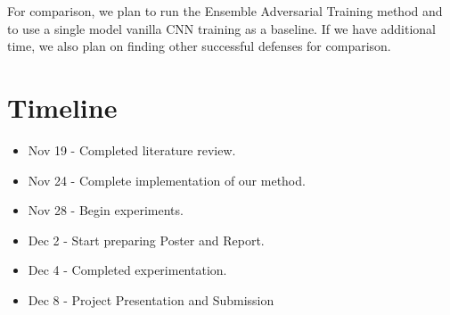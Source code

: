 \documentclass[10pt,journal,compsoc]{IEEEtran}
\begin{document}
For comparison, we plan to run the Ensemble Adversarial Training method and to use a single model vanilla CNN training as a baseline. If we have additional time, we also plan on finding other successful defenses for comparison. 
\section{Timeline}
\begin{itemize}
    \item Nov 19 - Completed literature review.
    \item Nov 24 - Complete implementation of our method. 
    \item Nov 28 - Begin experiments.
    \item Dec 2 - Start preparing Poster and Report.
    \item Dec 4 - Completed experimentation. 
    \item Dec 8 - Project Presentation and Submission
\end{itemize}




\end{document}
